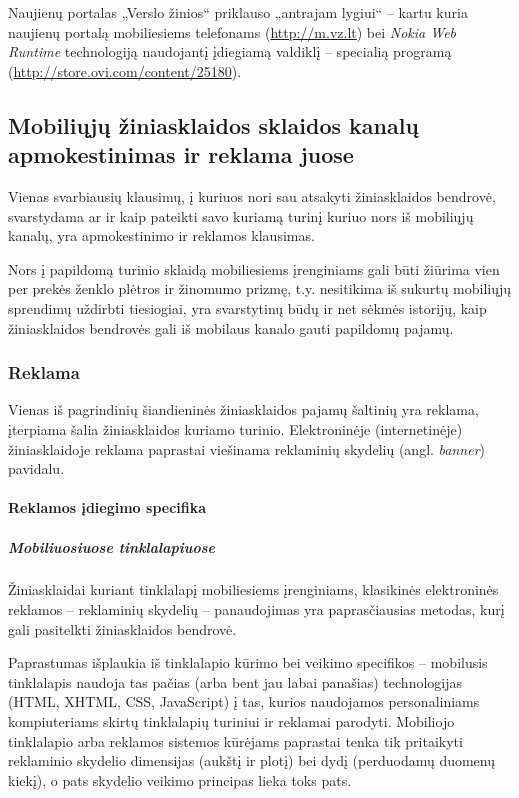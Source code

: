 \documentclass[kursinis-darbas]{vukf}
\begin{document}
Naujienų portalas „Verslo žinios“ priklauso „antrajam lygiui“ – kartu kuria naujienų portalą mobiliesiems telefonams (\url{http://m.vz.lt}) bei \emph{Nokia Web Runtime} technologiją naudojantį įdiegiamą valdiklį – specialią programą (\url{http://store.ovi.com/content/25180}).


\subsection{Mobiliųjų žiniasklaidos sklaidos kanalų apmokestinimas ir reklama juose}

Vienas svarbiausių klausimų, į kuriuos nori sau atsakyti žiniasklaidos bendrovė, svarstydama ar ir kaip pateikti savo kuriamą turinį kuriuo nors iš mobiliųjų kanalų, yra apmokestinimo ir reklamos klausimas.

Nors į papildomą turinio sklaidą mobiliesiems įrenginiams gali būti žiūrima vien per prekės ženklo plėtros ir žinomumo prizmę, t.y. nesitikima iš sukurtų mobiliųjų sprendimų uždirbti tiesiogiai, yra svarstytinų būdų ir net sėkmės istorijų, kaip žiniasklaidos bendrovės gali iš mobilaus kanalo gauti papildomų pajamų.


\subsubsection{Reklama}

Vienas iš pagrindinių šiandieninės žiniasklaidos pajamų šaltinių yra reklama, įterpiama šalia žiniasklaidos kuriamo turinio. Elektroninėje (internetinėje) žiniasklaidoje reklama paprastai viešinama reklaminių skydelių (angl. \emph{banner}) pavidalu.

\paragraph{Reklamos įdiegimo specifika}

\subparagraph{Mobiliuosiuose tinklalapiuose}

Žiniasklaidai kuriant tinklalapį mobiliesiems įrenginiams, klasikinės elektroninės reklamos – reklaminių skydelių – panaudojimas yra paprasčiausias metodas, kurį gali pasitelkti žiniasklaidos bendrovė.

Paprastumas išplaukia iš tinklalapio kūrimo bei veikimo specifikos – mobilusis tinklalapis naudoja tas pačias (arba bent jau labai panašias) technologijas (HTML, XHTML, CSS, JavaScript) į tas, kurios naudojamos personaliniams kompiuteriams skirtų tinklalapių turiniui ir reklamai parodyti. Mobiliojo tinklalapio arba reklamos sistemos kūrėjams paprastai tenka tik pritaikyti reklaminio skydelio dimensijas (aukštį ir plotį) bei dydį (perduodamų duomenų kiekį), o pats skydelio veikimo principas lieka toks pats.
\end{document}
